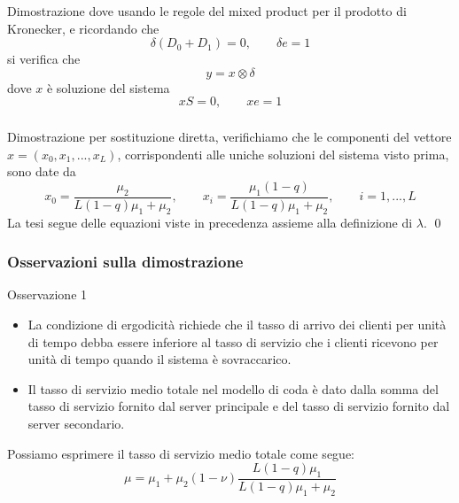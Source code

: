 \documentclass{beamer}
\begin{document}
\begin{frame}
    \frametitle{}
    \begin{block}{Dimostrazione}
            dove usando le regole del mixed product per il prodotto di Kronecker, e ricordando che
            $$ \delta(D_0 + D_1) = 0, \qquad \delta e = 1 $$
            si verifica che
            $$ y = x \otimes \delta $$
            dove $x$ è soluzione del sistema
            $$xS = 0, \qquad xe = 1 $$
    \end{block}
\end{frame}


\begin{frame}
    \frametitle{}
    \begin{block}{Dimostrazione}
        per sostituzione diretta, verifichiamo che le componenti del vettore $x = (x_0, x_1, ... , x_L)$, corrispondenti alle uniche soluzioni del sistema visto prima, sono date da
        \begin{equation*}
            x_0 = \frac{\mu_2}{L(1-q)\mu_1 + \mu_2}, \qquad x_i = \frac{\mu_1(1-q)}{L(1-q)\mu_1 + \mu_2}, \qquad i = 1, ..., L
        \end{equation*}
        La tesi segue delle equazioni viste in precedenza assieme alla definizione di $\lambda$.
        \qed
    \end{block}
\end{frame}


\begin{frame}
    \frametitle{Osservazioni sulla dimostrazione}
    \begin{block}{Osservazione 1}
        \begin{itemize}
            \item La condizione di ergodicità richiede che il tasso di arrivo dei clienti per unità di tempo debba essere inferiore al tasso di servizio che i clienti ricevono per unità di tempo quando il sistema è sovraccarico.
            \item Il tasso di servizio medio totale nel modello di coda è dato dalla somma del tasso di servizio fornito dal server principale e del tasso di servizio fornito dal server secondario.
        \end{itemize}
        Possiamo esprimere il tasso di servizio medio totale come segue:
        $$\mu = \mu_1 + \mu_2(1 - \nu) \frac{L(1-q)\mu_1}{L(1-q)\mu_1 + \mu_2}$$
    \end{block}
\end{frame}
\end{document}
